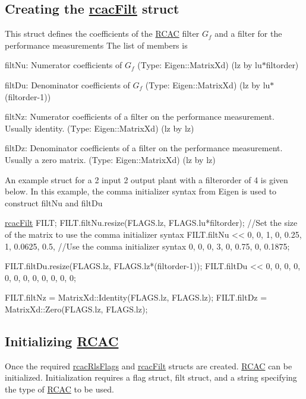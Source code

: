 \subsection*{Creating the \hyperlink{structrcac_filt}{rcac\+Filt} struct }

This struct defines the coefficients of the \hyperlink{class_r_c_a_c}{R\+C\+AC} filter $G_f$ and a filter for the performance measurements The list of members is
\begin{DoxyItemize}
\item filt\+Nu\+: Numerator coefficients of $G_f$ (Type\+: Eigen\+::\+Matrix\+Xd) (lz by lu$\ast$filtorder)
\item filt\+Du\+: Denominator coefficients of $G_f$ (Type\+: Eigen\+::\+Matrix\+Xd) (lz by lu$\ast$(filtorder-\/1))
\item filt\+Nz\+: Numerator coefficients of a filter on the performance measurement. Usually identity. (Type\+: Eigen\+::\+Matrix\+Xd) (lz by lz)
\item filt\+Dz\+: Denominator coefficients of a filter on the performance measurement. Usually a zero matrix. (Type\+: Eigen\+::\+Matrix\+Xd) (lz by lz)
\end{DoxyItemize}

An example struct for a 2 input 2 output plant with a filterorder of 4 is given below. In this example, the comma initializer syntax from Eigen is used to construct filt\+Nu and filt\+Du 
\begin{DoxyCode}
\hyperlink{structrcac_filt}{rcacFilt} FILT;
FILT.filtNu.resize(FLAGS.lz, FLAGS.lu*filtorder); \textcolor{comment}{//Set the size of the matrix to use the comma initializer
       syntax}
FILT.filtNu << 0, 0, 1, 0, 0.25, 1, 0.0625, 0.5, \textcolor{comment}{//Use the comma initializer syntax}
               0, 0, 0, 3, 0, 0.75, 0, 0.1875;

FILT.filtDu.resize(FLAGS.lz, FLAGS.lz*(filtorder-1));
FILT.filtDu << 0, 0, 0, 0, 0, 0,
               0, 0, 0, 0, 0, 0;

FILT.filtNz = MatrixXd::Identity(FLAGS.lz, FLAGS.lz);
FILT.filtDz =  MatrixXd::Zero(FLAGS.lz, FLAGS.lz);
\end{DoxyCode}


\subsection*{Initializing \hyperlink{class_r_c_a_c}{R\+C\+AC} }

Once the required \hyperlink{structrcac_rls_flags}{rcac\+Rls\+Flags} and \hyperlink{structrcac_filt}{rcac\+Filt} structs are created. \hyperlink{class_r_c_a_c}{R\+C\+AC} can be initialized. Initialization requires a flag struct, filt struct, and a string specifying the type of \hyperlink{class_r_c_a_c}{R\+C\+AC} to be used.


